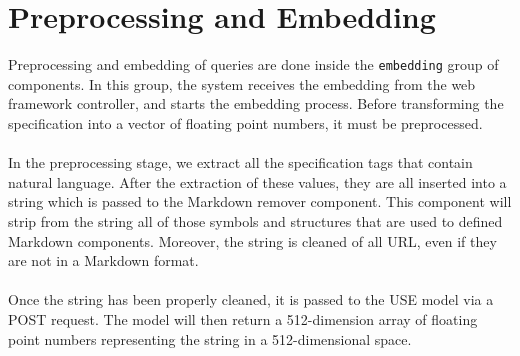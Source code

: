 \section{Preprocessing and Embedding}\label{sec:preprocessing-and-embedding}
Preprocessing and embedding of queries are done inside the \verb|embedding| group of components.
In this group, the system receives the embedding from the web framework controller, and starts the embedding process.
Before transforming the specification into a vector of floating point numbers, it must be preprocessed. \\ \\
In the preprocessing stage, we extract all the specification tags that contain natural language.
After the extraction of these values, they are all inserted into a string which is passed to the Markdown remover component.
This component will strip from the string all of those symbols and structures that are used to defined Markdown components.
Moreover, the string is cleaned of all URL, even if they are not in a Markdown format. \\ \\
Once the string has been properly cleaned, it is passed to the USE model via a POST request.
The model will then return a 512-dimension array of floating point numbers representing the string in a 512-dimensional space.
